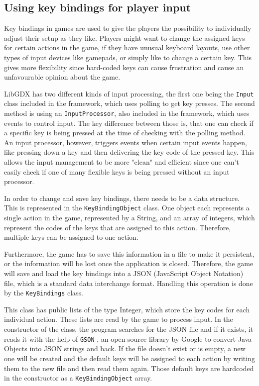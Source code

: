 \documentclass[12p]{article}
\begin{document}

\subsection{Using key bindings for player input} \label{DocKeyBindings}

Key bindings in games are used to give the players the possibility to individually adjust their setup as they like. Players might want to change the assigned keys for certain actions in the game, if they have unusual keyboard layouts, use other types of input devices like gamepads, or simply like to change a certain key. This gives more flexibility since hard-coded keys can cause frustration and cause an unfavourable opinion about the game.

LibGDX has two different kinds of input processing, the first one being the \texttt{Input} class included in the framework, which uses polling to get key presses. The second method is using an \texttt{InputProcessor}, also included in the framework, which uses events to control input. The key difference between those is, that one can check if a specific key is being pressed at the time of checking with the polling method. An input processor, however, triggers events when certain input events happen, like pressing down a key and then delivering the key code of the pressed key. This allows the input management to be more "clean" and efficient since one can't easily check if one of many flexible keys is being pressed without an input processor.

In order to change and save key bindings, there needs to be a data structure. This is represented in the \texttt{KeyBindingObject} class. One object each represents a single action in the game, represented by a String, and an array of integers, which represent the codes of the keys that are assigned to this action. Therefore, multiple keys can be assigned to one action.

Furthermore, the game has to save this information in a file to make it persistent, or the information will be lost once the application is closed. Therefore, the game will save and load the key bindings into a JSON (JavaScript Object Notation) file, which is a standard data interchange format. Handling this operation is done by the \texttt{KeyBindings} class. 

This class has public lists of the type Integer, which store the key codes for each individual action. These lists are read by the game to process input. In the constructor of the class, the program searches for the JSON file and if it exists, it reads it with the help of \texttt{GSON} \cite{GSON}, an open-source library by Google to convert Java Objects into JSON strings and back. If the file doesn't exist or is empty, a new one will be created and the default keys will be assigned to each action by writing them to the new file and then read them again. Those default keys are hardcoded in the constructor as a \texttt{KeyBindingObject} array.
\end{document}
